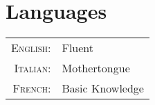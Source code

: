 \section{Languages}

\begin{tabular}{rl}
\textsc{English:} & Fluent\\

\textsc{Italian:} & Mothertongue\\

\textsc{French:} & Basic Knowledge\\
\end{tabular}